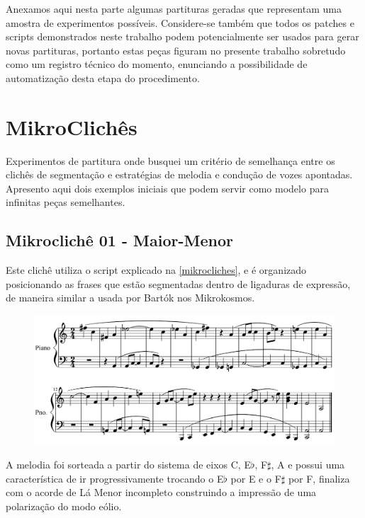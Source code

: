 \documentclass[
	12pt,				%
	openright,			%
	twoside,			%
	a4paper,			%
	english,			%
	french,				%
	spanish,			%
	brazil				%
	]{abntex2}
\begin{document}
Anexamos aqui nesta parte algumas partituras geradas que representam uma amostra de experimentos possíveis. Considere-se também que todos os patches e scripts demonstrados neste trabalho podem potencialmente ser usados para gerar novas partituras, portanto estas peças figuram no presente trabalho sobretudo como um registro técnico do momento, enunciando a possibilidade de automatização desta etapa do procedimento.

\section{MikroClichês}

Experimentos de partitura onde busquei um critério de semelhança entre os clichês de segmentação e estratégias de melodia e condução de vozes apontadas. Apresento aqui dois exemplos iniciais que podem servir como modelo para infinitas peças semelhantes.


\subsection{Mikroclichê 01 - Maior-Menor}

Este clichê utiliza o script explicado na \autoref{mikrocliches}, e é organizado posicionando as frases que estão segmentadas dentro de ligaduras de expressão, de maneira similar a usada por Bartók nos Mikrokosmos. 


\begin{figure}[!h]
	\begin{center}
	    \includegraphics*[scale=0.4]{score/MikroCliche01.png}
	\end{center}
\end{figure}


A melodia foi sorteada a partir do sistema de eixos C, E$\flat$, F$\sharp$, A e possui uma característica de ir progressivamente trocando o E$\flat$ por E e o F$\sharp$ por F, finaliza com o acorde de Lá Menor incompleto construindo a impressão de uma polarização do modo eólio.
\end{document}
